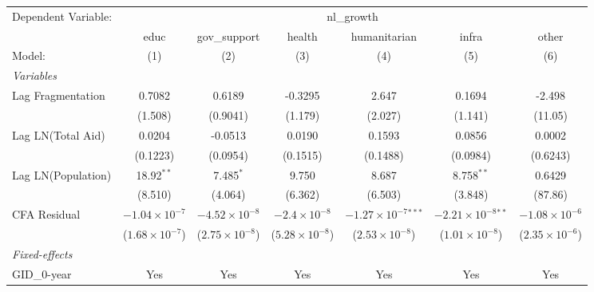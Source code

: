\begingroup
\centering
\begin{tabular}{lcccccc}
   \tabularnewline \midrule \midrule
   Dependent Variable: & \multicolumn{6}{c}{nl\_growth}\\
                      & educ                    & gov\_support            & health                  & humanitarian                   & infra                         & other \\   
   Model:             & (1)                     & (2)                     & (3)                     & (4)                            & (5)                           & (6)\\  
   \midrule
   \emph{Variables}\\
   Lag Fragmentation  & 0.7082                  & 0.6189                  & -0.3295                 & 2.647                          & 0.1694                        & -2.498\\   
                      & (1.508)                 & (0.9041)                & (1.179)                 & (2.027)                        & (1.141)                       & (11.05)\\   
   Lag LN(Total Aid)  & 0.0204                  & -0.0513                 & 0.0190                  & 0.1593                         & 0.0856                        & 0.0002\\   
                      & (0.1223)                & (0.0954)                & (0.1515)                & (0.1488)                       & (0.0984)                      & (0.6243)\\   
   Lag LN(Population) & 18.92$^{**}$            & 7.485$^{*}$             & 9.750                   & 8.687                          & 8.758$^{**}$                  & 0.6429\\   
                      & (8.510)                 & (4.064)                 & (6.362)                 & (6.503)                        & (3.848)                       & (87.86)\\   
   CFA Residual       & $-1.04\times 10^{-7}$   & $-4.52\times 10^{-8}$   & $-2.4\times 10^{-8}$    & $-1.27\times 10^{-7}$$^{***}$  & $-2.21\times 10^{-8}$$^{**}$  & $-1.08\times 10^{-6}$\\    
                      & ($1.68\times 10^{-7}$)  & ($2.75\times 10^{-8}$)  & ($5.28\times 10^{-8}$)  & ($2.53\times 10^{-8}$)         & ($1.01\times 10^{-8}$)        & ($2.35\times 10^{-6}$)\\    
   \midrule
   \emph{Fixed-effects}\\
   GID\_0-year        & Yes                     & Yes                     & Yes                     & Yes                            & Yes                           & Yes\\  

\end{tabular}
